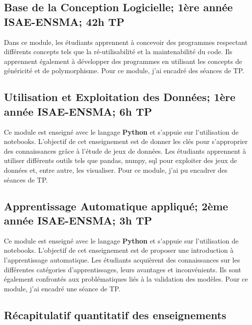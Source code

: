 \documentclass[11pt,a4paper,oneside]{article}
\begin{document}
\subsection{Base de la Conception Logicielle; 1ère année ISAE-ENSMA; 42h TP}
Dans ce module, les étudiants apprennent à concevoir des programmes respectant
différents concepts tels que la ré-utilisabilité et la maintenabilité du code. %
Ils apprennent également à développer des programmes en utilisant les concepts
de généricité et de polymorphisme.
Pour ce module, j'ai encadré des séances de TP.

\subsection{Utilisation et Exploitation des Données; 1ère année ISAE-ENSMA; 6h TP}
Ce module est enseigné avec le langage \textbf{Python} et s'appuie sur l'utilisation de
notebooks. %
L'objectif de cet enseignement est de donner les clés pour s'approprier des
connaissances grâce à l'étude de jeux de données. %
Les étudiants apprennent à utiliser différents outils tels que pandas, numpy,
sql pour exploiter des jeux de données et, entre autre, les visualiser. %
Pour ce module, j'ai pu encadrer des séances de TP.

\subsection{Apprentissage Automatique appliqué; 2ème année ISAE-ENSMA; 3h TP}
Ce module est enseigné avec le langage \textbf{Python} et s'appuie sur l'utilisation de
notebooks. %
L'objectif de cet enseignement est de proposer une introduction à
l'apprentissage automatique. %
Les étudiants acquièrent des connaissances sur les différentes catégories
d'apprentissages, leurs avantages et inconvénients. %
Ils sont également confrontés aux problématiques liés à la validation des
modèles. %
Pour ce module, j'ai encadré une séance de TP. %

\subsection{Récapitulatif quantitatif des enseignements}
\end{document}
